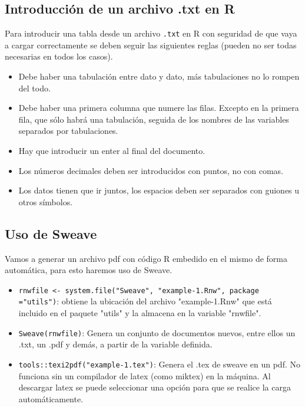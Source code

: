 \documentclass[a4paper, 12pt]{article}
\begin{document}
	\subsection{Introducción de un archivo .txt en R}
	Para introducir una tabla desde un archivo \texttt{.txt} en R con seguridad de que vaya a cargar correctamente se deben seguir las siguientes reglas (pueden no ser todas necesarias en todos los casos).
	
	\begin{itemize}
		\item Debe haber una tabulación entre dato y dato, más tabulaciones no lo rompen del todo.
		
		\item Debe haber una primera columna que numere las filas. Excepto en la primera fila, que sólo habrá una tabulación, seguida de los nombres de las variables separados por tabulaciones.
		
		\item Hay que introducir un enter al final del documento.
		
		\item Los números decimales deben ser introducidos con puntos, no con comas.
		
		\item Los datos tienen que ir juntos, los espacios deben ser separados con guiones u otros símbolos.
	\end{itemize}
	
	
	\subsection{Uso de Sweave}
	Vamos a generar un archivo pdf con código R embedido en el mismo de forma automática, para esto haremos uso de Sweave.
	
	\begin{itemize}
		\item \texttt{rnwfile <- system.file("Sweave", \string"example-1.Rnw", package =\string"utils")}: obtiene la ubicación del archivo "example-1.Rnw" que está incluido en el paquete "utils" y la almacena en la variable "rnwfile".
		
		\item \texttt{Sweave(rnwfile)}: Genera un conjunto de documentos nuevos, entre ellos un .txt, un .pdf y demás, a partir de la variable definida.
		
		\item \texttt{tools::texi2pdf(\string"example-1.tex")}: Genera el .tex de sweave en un pdf. No funciona sin un compilador de latex (como miktex) en la máquina. Al descargar latex se puede seleccionar una opción para que se realice la carga automáticamente.
	\end{itemize}
	
\end{document}
